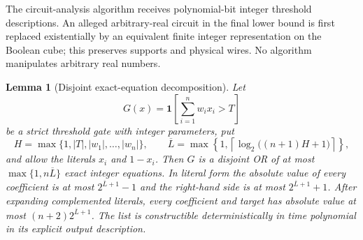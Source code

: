\documentclass[11pt,letterpaper]{article}
\newtheorem{lemma}[theorem]{Lemma}
\theoremstyle{definition}
\theoremstyle{remark}
\begin{document}
The circuit-analysis algorithm receives polynomial-bit integer threshold
descriptions. An alleged arbitrary-real circuit in the final lower bound
is first replaced existentially by an equivalent finite integer
representation on the Boolean cube; this preserves supports and physical
wires. No algorithm manipulates arbitrary real numbers.

\begin{lemma}[Disjoint exact-equation decomposition]
\label{lem:threshold-decomposition}
Let \[
G(x)=\mathbf1\!\left[\sum_{i=1}^n w_ix_i>T\right]
\] be a strict threshold gate with integer parameters, put \[
H=\max\{1,|T|,|w_1|,\ldots,|w_n|\},
\qquad
\overline L=\max\left\{1,
\left\lceil\log_2\bigl((n+1)H+1\bigr)\right\rceil\right\},
\] and allow the literals \(x_i\) and \(1-x_i\). Then \(G\) is a
disjoint OR of at most \(\max\{1,n\overline L\}\) exact integer
equations. In literal form the absolute value of every coefficient is at
most \(2^{\overline L+1}-1\) and the right-hand side is at most
\(2^{\overline L+1}+1\). After expanding complemented literals, every
coefficient and target has absolute value at most
\((n+2)2^{\overline L+1}\). The list is constructible deterministically
in time polynomial in its explicit output description.
\end{lemma}
\end{document}
